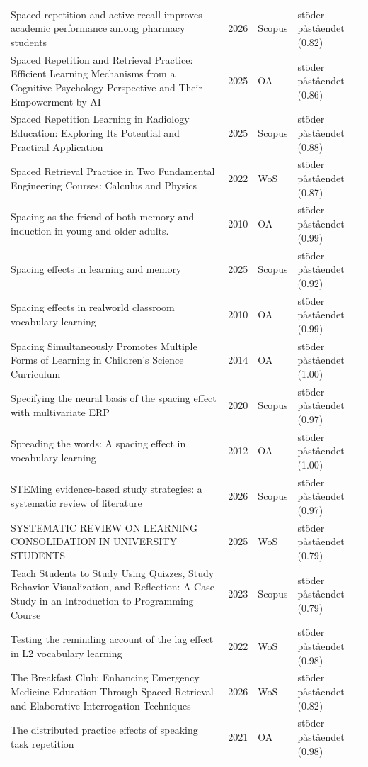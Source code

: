 \begin{longtable}{@{}%
  >{\raggedright\arraybackslash}p{}c%
  >{\raggedright\arraybackslash}p{}%
  >{\raggedright\arraybackslash}p{}@{}}
Spaced repetition and active recall improves academic performance among pharmacy students & 2026 & Scopus & stöder påståendet (0.82) \\
Spaced Repetition and Retrieval Practice: Efficient Learning Mechanisms from a Cognitive Psychology Perspective and Their Empowerment by AI & 2025 & OA & stöder påståendet (0.86) \\
Spaced Repetition Learning in Radiology Education: Exploring Its Potential and Practical Application & 2025 & Scopus & stöder påståendet (0.88) \\
Spaced Retrieval Practice in Two Fundamental Engineering Courses: Calculus and Physics & 2022 & WoS & stöder påståendet (0.87) \\
Spacing as the friend of both memory and induction in young and older adults. & 2010 & OA & stöder påståendet (0.99) \\
Spacing effects in learning and memory & 2025 & Scopus & stöder påståendet (0.92) \\
Spacing effects in realworld classroom vocabulary learning & 2010 & OA & stöder påståendet (0.99) \\
Spacing Simultaneously Promotes Multiple Forms of Learning in Children's Science Curriculum & 2014 & OA & stöder påståendet (1.00) \\
Specifying the neural basis of the spacing effect with multivariate ERP & 2020 & Scopus & stöder påståendet (0.97) \\
Spreading the words: A spacing effect in vocabulary learning & 2012 & OA & stöder påståendet (1.00) \\
STEMing evidence-based study strategies: a systematic review of literature & 2026 & Scopus & stöder påståendet (0.97) \\
SYSTEMATIC REVIEW ON LEARNING CONSOLIDATION IN UNIVERSITY STUDENTS & 2025 & WoS & stöder påståendet (0.79) \\
Teach Students to Study Using Quizzes, Study Behavior Visualization, and Reflection: A Case Study in an Introduction to Programming Course & 2023 & Scopus & stöder påståendet (0.79) \\
Testing the reminding account of the lag effect in L2 vocabulary learning & 2022 & WoS & stöder påståendet (0.98) \\
The Breakfast Club: Enhancing Emergency Medicine Education Through Spaced Retrieval and Elaborative Interrogation Techniques & 2026 & WoS & stöder påståendet (0.82) \\
The distributed practice effects of speaking task repetition & 2021 & OA & stöder påståendet (0.98) \\

\end{longtable}
